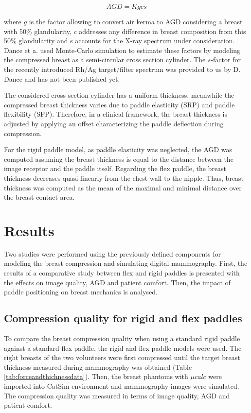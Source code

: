 \begin{equation}
AGD = K g c s
\end{equation}

where $g$ is the factor allowing to convert air kerma to AGD considering a breast with 50\% glandularity, $c$ addresses any difference in breast composition from this 50\% glandularity and s accounts for the X-ray spectrum under consideration. Dance et a. used Monte-Carlo simulation to estimate these factors by modeling the compressed breast as a semi-circular cross section cylinder. The $s$-factor for the recently introduced Rh/Ag target/filter spectrum was provided to us by D. Dance and has not been published yet.

The considered cross section cylinder has a uniform thickness, meanwhile the compressed  breast thickness varies due to paddle elasticity (SRP) and paddle flexibility (SFP). Therefore, in a clinical framework, the breast thickness is adjusted by applying an offset characterizing the paddle deflection during compression.      

For the rigid paddle model, as paddle elasticity was neglected, the AGD was computed assuming the breast thickness is equal to the distance between the image receptor and the paddle itself. Regarding the flex paddle, the breast thickness decreases quasi-linearly from the chest wall to the nipple. Thus, breast thickness was computed as the mean of the maximal and minimal distance over the breast contact area.

\section{Results}\label{section:breastcompressionevaluation}
Two studies were performed using the previously defined components for modeling the breast compression and simulating digital mammography. First, the results of a comparative study between flex and rigid paddles is presented with the effects on image quality, AGD and patient comfort. Then, the impact of paddle positioning on breast mechanics is analysed.   
\subsection{Compression quality for rigid and flex paddles}

To compare the breast compression quality when using a standard rigid paddle against a standard flex paddle, the rigid and flex paddle models were used. The right breasts of the two volunteers were first compressed until the target breast thickness measured during mammography was obtained (Table \ref{tab:forceandthichnessdata}). Then, the breast phantoms with $\mu calc $ were imported into CatSim environment and mammography images were simulated. The compression quality was measured in terms of image quality, AGD and patient comfort.

